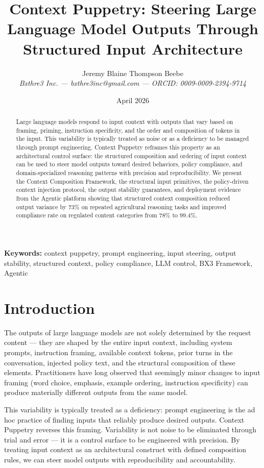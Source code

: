 \documentclass[12pt]{article}
\title{Context Puppetry: Steering Large Language Model Outputs Through Structured Input Architecture}
\author{Jeremy Blaine Thompson Beebe\\ \textit{Bxthre3 Inc. --- bxthre3inc@gmail.com --- ORCID: 0009-0009-2394-9714}}
\date{April 2026}
\begin{document}
\maketitle

\begin{abstract}\noindent
Large language models respond to input context with outputs that vary based on framing, priming, instruction specificity, and the order and composition of tokens in the input. This variability is typically treated as noise or as a deficiency to be managed through prompt engineering. Context Puppetry reframes this property as an architectural control surface: the structured composition and ordering of input context can be used to steer model outputs toward desired behaviors, policy compliance, and domain-specialized reasoning patterns with precision and reproducibility. We present the Context Composition Framework, the structural input primitives, the policy-driven context injection protocol, the output stability guarantees, and deployment evidence from the Agentic platform showing that structured context composition reduced output variance by 73\% on repeated agricultural reasoning tasks and improved compliance rate on regulated content categories from 78\% to 99.4\%.
\end{abstract}

\medskip\noindent\textbf{Keywords:} context puppetry, prompt engineering, input steering, output stability, structured context, policy compliance, LLM control, BX3 Framework, Agentic

\newpage

\section{Introduction}
The outputs of large language models are not solely determined by the request content --- they are shaped by the entire input context, including system prompts, instruction framing, available context tokens, prior turns in the conversation, injected policy text, and the structural composition of these elements. Practitioners have long observed that seemingly minor changes to input framing (word choice, emphasis, example ordering, instruction specificity) can produce materially different outputs from the same model.

This variability is typically treated as a deficiency: prompt engineering is the ad hoc practice of finding inputs that reliably produce desired outputs. Context Puppetry reverses this framing. Variability is not noise to be eliminated through trial and error --- it is a control surface to be engineered with precision. By treating input context as an architectural construct with defined composition rules, we can steer model outputs with reproducibility and accountability.
\end{document}

